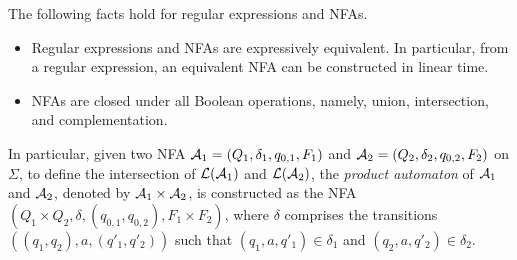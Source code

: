 \begin{proposition}[\cite{HU79}]
The following facts hold for regular expressions and NFAs.
\begin{itemize}
\item Regular expressions and NFAs are expressively equivalent. In particular, from a regular expression, an equivalent NFA can be constructed in linear time.  
%
\item NFAs are closed under all Boolean operations, namely, union, intersection, and complementation.
\end{itemize}
\end{proposition}

In particular, given two NFA $\mathcal{A}_1=(Q_1, \delta_1, q_{0,1}, F_1)$ and $\mathcal{A}_2=(Q_2, \delta_2, q_{0,2}, F_2)$ on $\Sigma$, to define the intersection of $\mathcal{L}(\mathcal{A}_1)$ and $\mathcal{L}(\mathcal{A}_2)$, the \emph{product automaton} of $\mathcal{A}_1$ and $\mathcal{A}_2$, denoted by $\mathcal{A}_1 \times \mathcal{A}_2$, is constructed as the NFA $(Q_1 \times Q_2, \delta, (q_{0,1}, q_{0,2}), F_1 \times F_2)$, where $\delta$ comprises the transitions $((q_1, q_2), a, (q'_1, q'_2))$ such that $(q_1, a, q'_1) \in \delta_1$ and $(q_2, a, q'_2) \in \delta_2$.  

